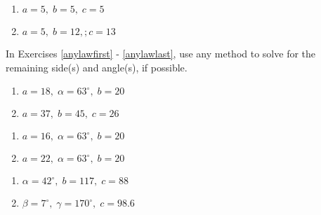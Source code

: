 \begin{multicols}{2} 

\begin{enumerate}

\setcounter{enumi}{\value{HW}}

\item $a = 5, \; b = 5, \; c = 5$
\item $a = 5, \; b = 12,; c = 13$ \label{thirdherons} \label{lastlawofcosines}

\setcounter{HW}{\value{enumi}}

\end{enumerate}

\end{multicols}

In Exercises \ref{anylawfirst} - \ref{anylawlast}, use any method to solve for the remaining side(s) and angle(s), if possible.

\begin{multicols}{2}

\begin{enumerate}

\setcounter{enumi}{\value{HW}}

\item $a = 18, \; \alpha = 63^{\circ}, \; b = 20$ \label{ambigfirst} \label{anylawfirst}
\item $a = 37, \; b = 45, \; c = 26$

\setcounter{HW}{\value{enumi}}

\end{enumerate}

\end{multicols}

\begin{multicols}{2} 

\begin{enumerate}

\setcounter{enumi}{\value{HW}}

\item $a = 16, \; \alpha = 63^{\circ}, \; b = 20$ \label{ambigsecond}
\item $a = 22, \; \alpha = 63^{\circ}, \; b = 20$ \label{ambigthird}

\setcounter{HW}{\value{enumi}}

\end{enumerate}

\end{multicols}

\begin{multicols}{2} 

\begin{enumerate}

\setcounter{enumi}{\value{HW}}

\item $\alpha = 42^{\circ}, \; b = 117, \; c = 88$
\item $\beta = 7^{\circ}, \; \gamma = 170^{\circ}, \; c = 98.6$ \label{anylawlast}

\setcounter{HW}{\value{enumi}}

\end{enumerate}

\end{multicols}

